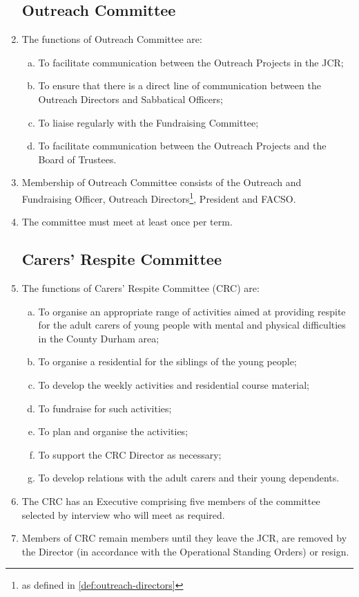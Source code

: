 \documentclass[12pt]{article}
\begin{document}
\begin{enumerate}
    \subsection{Outreach Committee}
    \item The functions of Outreach Committee are:
    \begin{enumerate}[(a)]
        \item To facilitate communication between the Outreach Projects in the JCR;
        \item To ensure that there is a direct line of communication between the Outreach Directors and Sabbatical Officers;
        \item To liaise regularly with the Fundraising Committee;
        \item To facilitate communication between the Outreach Projects and the Board of Trustees.
    \end{enumerate}
    \item Membership of Outreach Committee consists of the Outreach and Fundraising Officer, Outreach Directors\footnote{as defined in \ref{def:outreach-directors}}, President and FACSO.
    \item The committee must meet at least once per term.
    \subsection{Carers’ Respite Committee}
    \item The functions of Carers’ Respite Committee (CRC) are:
    \begin{enumerate}[(a)]
        \item To organise an appropriate range of activities aimed at providing respite for the adult carers of young people with mental and physical difficulties in the County Durham area;
        \item To organise a residential for the siblings of the young people;
        \item To develop the weekly activities and residential course material;
        \item To fundraise for such activities;
        \item To plan and organise the activities;
        \item To support the CRC Director as necessary;
        \item To develop relations with the adult carers and their young dependents.
    \end{enumerate}
    \item The CRC has an Executive comprising five members of the committee selected by interview who will meet as required.
    \item Members of CRC remain members until they leave the JCR, are removed by the Director (in accordance with the Operational Standing Orders) or resign.

\end{enumerate}
\end{document}
